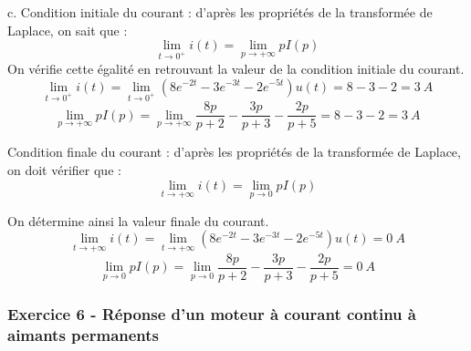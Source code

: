 \documentclass[11pt]{report}
\begin{document}
	\vspace{0.5\baselineskip}
	
	c. Condition initiale du courant : d'après les propriétés de la transformée de Laplace, on sait que :
	\begin{equation*}
		\lim_{t\rightarrow0^{+}} i(t)=\lim_{p \to +\infty} pI(p)
	\end{equation*}
	On vérifie cette égalité en retrouvant la valeur de la condition initiale du courant.
	\begin{equation*}
		\lim_{t\rightarrow0^{+}} i(t)=\lim_{t\rightarrow0^{+}}(8e^{-2t}-3e^{-3t}-2e^{-5t})u(t)=8-3-2=3~A
	\end{equation*}
	\begin{equation*}
		\lim_{p \to +\infty} pI(p)=	\lim_{p \to +\infty} \frac{8p}{p+2}-\frac{3p}{p+3}-\frac{2p}{p+5}=8-3-2=3~A
	\end{equation*}
	
	Condition finale du courant : d'après les propriétés de la transformée de Laplace, on doit vérifier que :
	\begin{equation*}
	\lim_{t \to +\infty} i(t)=\lim_{p \to 0} pI(p)
	\end{equation*}
	
	On détermine ainsi la valeur finale du courant.
	\begin{equation*}
	\lim_{t \to +\infty} i(t)=\lim_{t \to +\infty}(8e^{-2t}-3e^{-3t}-2e^{-5t})u(t)=0~A
	\end{equation*}
	\begin{equation*}
	\lim_{p \to 0} pI(p)=	\lim_{p \to 0} \frac{8p}{p+2}-\frac{3p}{p+3}-\frac{2p}{p+5}=0~A
	\end{equation*}
	
	\vspace{1\baselineskip}
	
	
	\subsubsection{Exercice 6 - Réponse d'un moteur à courant continu à aimants permanents}
\end{document}
